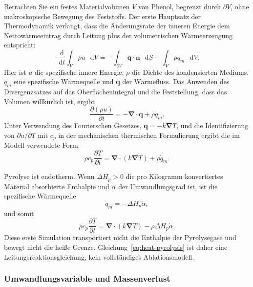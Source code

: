\documentclass[oneside,openany]{amsdtx}
\newcommand{\dd}{\mathop{}\!\mathrm{d}}
\newcommand{\pd}{\partial}
\newcommand{\vect}[1]{\bm{#1}}
\begin{document}
Betrachten Sie ein festes Materialvolumen \(V\) von Phenol, begrenzt durch \(\partial V\), ohne makroskopische Bewegung des Feststoffs. Der erste Hauptsatz der Thermodynamik verlangt, dass die Änderungsrate der inneren Energie dem Nettowärmeeintrag durch Leitung plus der volumetrischen Wärmeerzeugung entspricht:
\begin{equation}
  \frac{\dd}{\dd t}\int_V \rho u\,\dd V
  =-\int_{\partial V}\vect q\cdot\vect n\,\dd S
   +\int_V \rho\dot q_m\,\dd V .
  \label{eq:first-law-integral}
\end{equation}
Hier ist \(u\) die spezifische innere Energie, \(\rho\) die Dichte des kondensierten Mediums, \(\dot q_m\) eine spezifische Wärmequelle und \(\vect q\) der Wärmefluss. Das Anwenden des Divergenzsatzes auf das Oberflächenintegral und die Feststellung, dass das Volumen willkürlich ist, ergibt
\begin{equation}
  \frac{\pd(\rho u)}{\pd t}=-\vect\nabla\cdot\vect q+\rho\dot q_m .
\end{equation}
Unter Verwendung des Fourierschen Gesetzes, \(\vect q=-k\vect\nabla T\), und die Identifizierung von \(\pd u/\pd T\) mit \(c_p\) in der mechanischen thermischen Formulierung ergibt die im Modell verwendete Form:
\begin{equation}
  \rho c_p\frac{\pd T}{\pd t}
  =\vect\nabla\cdot\left(k\vect\nabla T\right)+\rho\dot q_m .
  \label{eq:heat-general}
\end{equation}

Pyrolyse ist endotherm. Wenn \(\Delta H_p>0\) die pro Kilogramm konvertiertes Material absorbierte Enthalpie und \(\alpha\) der Umwandlungsgrad ist, ist die spezifische Wärmequelle
\begin{equation}
  \dot q_m=-\Delta H_p\dot\alpha,
\end{equation}
und somit
\begin{equation}
  \boxed{\rho c_p\frac{\pd T}{\pd t}
  =\vect\nabla\cdot(k\vect\nabla T)
  -\rho\Delta H_p\dot\alpha.}
  \label{eq:heat-pyrolysis}
\end{equation}
Diese erste Simulation transportiert nicht die Enthalpie der Pyrolysegase und bewegt nicht die heiße Grenze. Gleichung~\eqref{eq:heat-pyrolysis} ist daher eine Leitungsreaktionsgleichung, kein vollständiges Ablationsmodell.

\subsubsection{Umwandlungsvariable und Massenverlust}
\end{document}
